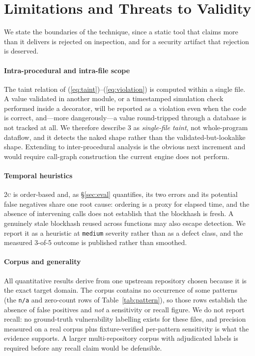\section{Limitations and Threats to Validity}
\label{sec:limits}

We state the boundaries of the technique, since a static tool that claims more
than it delivers is rejected on inspection, and for a security artifact that
rejection is deserved.

\paragraph{Intra-procedural and intra-file scope}
The taint relation of (\ref{eq:taint})--(\ref{eq:violation}) is computed within
a single file. A value validated in another module, or a timestamped
simulation check performed inside a decorator, will be reported as a violation
even when the code is correct, and---more dangerously---a value round-tripped
through a database is not tracked at all. We therefore describe \textsc{3} as
\emph{single-file taint}, not whole-program dataflow, and it detects the naked
shape rather than the validated-but-lookalike shape. Extending to
inter-procedural analysis is the obvious next increment and would require
call-graph construction the current engine does not perform.

\paragraph{Temporal heuristics}
\textsc{2c} is order-based and, as \S\ref{sec:eval} quantifies, its two errors
and its potential false negatives share one root cause: ordering is a proxy for
elapsed time, and the absence of intervening calls does not establish that the
blockhash is fresh. A genuinely stale blockhash reused across functions may
also escape detection. We report it as a heuristic at \texttt{medium} severity
rather than as a defect class, and the measured 3-of-5 outcome is published
rather than smoothed.

\paragraph{Corpus and generality}
All quantitative results derive from one upstream repository chosen because it
is the exact target domain. The corpus contains no occurrence of some patterns
(the \texttt{n/a} and zero-count rows of Table~\ref{tab:pattern}), so those
rows establish the absence of false positives and \emph{not} a sensitivity or
recall figure. We do not report recall: no ground-truth vulnerability
labelling exists for these files, and precision measured on a real corpus plus
fixture-verified per-pattern sensitivity is what the evidence supports. A
larger multi-repository corpus with adjudicated labels is required before any
recall claim would be defensible.

